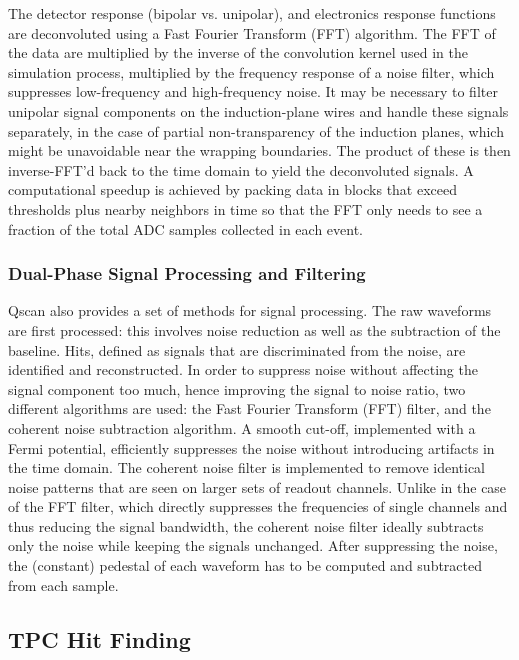 The detector response (bipolar vs. unipolar), and
electronics response functions are deconvoluted using a Fast Fourier
Transform (FFT) algorithm.  The FFT of the data are multiplied by the
inverse of the convolution kernel used in the simulation process,
multiplied by the frequency response of a noise filter, which
suppresses low-frequency and high-frequency noise.  It may be
necessary to filter unipolar signal components on the induction-plane
wires and handle these signals separately, in the case of partial
non-transparency of the induction planes, which might be unavoidable
near the wrapping boundaries.  The product of these is then
inverse-FFT'd back to the time domain to yield the deconvoluted
signals.  A computational speedup is achieved by packing data in
blocks that exceed thresholds plus nearby neighbors in time so that
the FFT only needs to see a fraction of the total ADC samples
collected in each event.

\subsubsection{Dual-Phase Signal Processing and Filtering}

Qscan also provides a set of methods for signal processing. 
The raw waveforms are first processed: this involves noise reduction as well as the subtraction of the baseline.
Hits, defined as signals that are discriminated from the noise, are identified and reconstructed.
In order to suppress noise without affecting the signal component too much, hence improving the signal to noise ratio, 
two different algorithms are used: the Fast Fourier Transform (FFT) filter, and the coherent noise subtraction algorithm.
A smooth cut-off, implemented with a Fermi potential, efficiently suppresses the noise without introducing artifacts in the
time domain.
The coherent noise filter is implemented to remove identical noise patterns that are seen on larger sets of readout channels. 
Unlike in the case of the FFT filter, which directly suppresses the frequencies of single 
channels and thus reducing the signal bandwidth, the coherent noise filter ideally subtracts only the noise while keeping the signals unchanged.
After suppressing the noise, the (constant) pedestal of each waveform has to be computed and subtracted from each sample.

\subsection{TPC Hit Finding}


